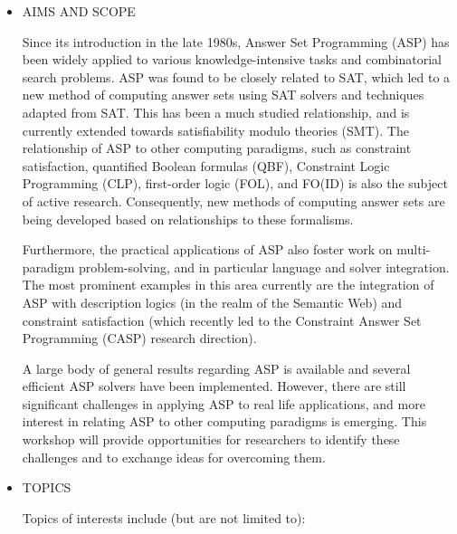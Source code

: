 \documentclass[prodmode,acmtecs]{acmsmall} %
\begin{document}
\begin{itemize}\item  AIMS AND SCOPE 
 
  Since its introduction in the late 1980s, Answer Set Programming (ASP) has been widely applied to various knowledge-intensive tasks and combinatorial search problems. ASP was found to be closely related to SAT, which led to a new method of computing answer sets using SAT solvers and techniques adapted from SAT. This has been a much studied relationship, and is currently extended towards satisfiability modulo theories (SMT). The relationship of ASP to other computing paradigms, such as constraint satisfaction, quantified Boolean formulas (QBF), Constraint Logic Programming (CLP), first-order logic (FOL), and FO(ID) is also the subject of active research. Consequently, new methods of computing answer sets are being developed based on relationships to these formalisms. 
 
  Furthermore, the practical applications of ASP also foster work on multi-paradigm problem-solving, and in particular language and solver integration. The most prominent examples in this area currently are the integration of ASP with description logics (in the realm of the Semantic Web) and constraint satisfaction (which recently led to the Constraint Answer Set Programming (CASP) research direction). 
 
  A large body of general results regarding ASP is available and several efficient ASP solvers have been implemented. However, there are still significant challenges in applying ASP to real life applications, and more interest in relating ASP to other computing paradigms is emerging. This  workshop will provide opportunities for researchers to identify these challenges and to exchange ideas for overcoming them. 
 
\item  TOPICS 
 
  Topics of interests include (but are not limited to): 
 

\end{itemize}
\end{document}

